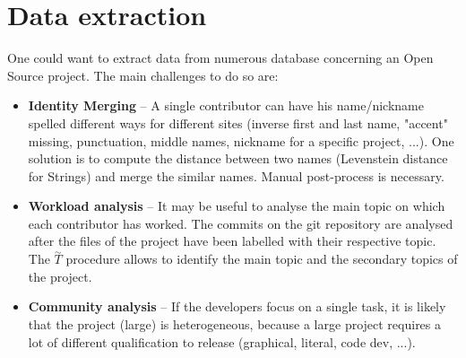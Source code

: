 \documentclass[a4paper,11pt]{report}
\begin{document}
\section{Data extraction}\noindent
	One could want to extract data from numerous database
		concerning an Open Source project. The main
		challenges to do so are:
	\begin{itemize}
		\setlength{\itemsep}{0pt}		
		\setlength{\parskip}{0pt}		
		\setlength{\parsep}{0pt}	
		\item \textbf{Identity Merging} -- 
			A single contributor can have his name/nickname
			spelled different ways for different sites
			(inverse first and last name, "accent" missing,
			punctuation, middle names, nickname for a 
			specific project, ...). One solution
			is to compute the distance between two
			names (Levenstein distance for Strings)
			and merge the similar names. Manual 
			post-process is	necessary.
		\item \textbf{Workload analysis} --
			It may be useful to analyse the main
			topic on which each contributor has 
			worked. The commits on the git repository
			are analysed after the files of the project
			have been labelled with their respective topic.
			The $\overset{\sim}{T}$	procedure allows to
			identify the main topic and the secondary
			topics of the project.
		\item \textbf{Community analysis} -- 
			If the developers focus on a single task,
			it is likely that the project (large) is
			heterogeneous, because a large project requires
			a lot of different qualification to release
			(graphical, literal, code dev, ...).
	\end{itemize}
%
\end{document}
